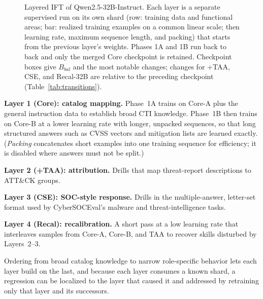 \documentclass[conference]{IEEEtran}
\begin{document}
\begin{figure}[t]
\caption{Layered IFT of Qwen2.5-32B-Instruct. Each layer is a separate supervised run on its own shard (row: training data and functional areas; bar: realized training examples on a common linear scale; then learning rate, maximum sequence length, and packing) that starts from the previous layer's weights. Phases 1A and 1B run back to back and only the merged Core checkpoint is retained. Checkpoint boxes give $B_{bal}$ and the most notable changes; changes for +TAA, CSE, and Recal-32B are relative to the preceding checkpoint (Table~\ref{tab:transitions}).}
\label{fig:layered}
\end{figure}

\textbf{Layer 1 (Core): catalog mapping.} Phase~1A trains on Core-A plus the general instruction data to establish broad CTI knowledge. Phase~1B then trains on Core-B at a lower learning rate with longer, unpacked sequences, so that long structured answers such as CVSS vectors and mitigation lists are learned exactly. (\emph{Packing} concatenates short examples into one training sequence for efficiency; it is disabled where answers must not be split.)

\textbf{Layer 2 (+TAA): attribution.} Drills that map threat-report descriptions to ATT\&CK groups.

\textbf{Layer 3 (CSE): SOC-style response.} Drills in the multiple-answer, letter-set format used by CyberSOCEval's malware and threat-intelligence tasks.

\textbf{Layer 4 (Recal): recalibration.} A short pass at a low learning rate that interleaves samples from Core-A, Core-B, and TAA to recover skills disturbed by Layers~2--3.

Ordering from broad catalog knowledge to narrow role-specific behavior lets each layer build on the last, and because each layer consumes a known shard, a regression can be localized to the layer that caused it and addressed by retraining only that layer and its successors.
\end{document}
